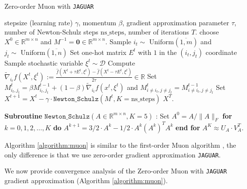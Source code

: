 \documentclass{article}
\theoremstyle{plain}
\theoremstyle{definition}
\theoremstyle{remark}
\begin{document}
\begin{algorithm}[H]
   \caption{Zero-order Muon with \texttt{JAGUAR} \cite{veprikov2024new}}
   \label{algorithm:muon}
\begin{algorithmic}[1]
     stepsize (learning rate) $\gamma$, momentum $\beta$, gradient approximation parameter $\tau$, number of Newton-Schulz steps $\text{ns\_steps}$, number of iterations $T$.
     choose  $X^{0} \in \mathbb{R}^{m \times n}$ and $M^{-1} = \mathbf{0} \in \mathbb{R}^{m \times n}$.
        \State Sample $i_t \sim \text{ Uniform}(\overline{1, m})$ and $j_t \sim \text{ Uniform}(\overline{1, n})$
        \State Set one-hot matrix $E^t$ with $1$ in the $(i_t, j_t)$ coordinate
        \State Sample stochastic variable $\xi^t \sim \mathcal{D}$
        \State Compute $\widetilde{\nabla}_{i_t} f(X^{t}, \xi^t) := \frac{\hat{f}(X^t + \tau E^t, \xi^t) - \hat{f}(X^t - \tau E^t, \xi^t)}{2 \tau} \in \mathbb{R}$
        \State Set $M^{t}_{i_t, j_t} = \beta M^{t-1}_{i_t, j_t} + (1 - \beta) \widetilde{\nabla}_{i_t} f(x^{t}, \xi^t)$ and $M^{t}_{i \neq i_t, j \neq j_t} = M^{t-1}_{i \neq i_t, j \neq j_t}$ \label{line:mt_jaguar}
        \State Set $X^{t+1} = X^t - \gamma \cdot \texttt{Newton\_Schulz}(M^{t}, K=\text{ns\_steps})$
    \EndFor
     $X^T$.
\end{algorithmic}
\begin{algorithmic}[1]
    \State \textbf{Subroutine} $\texttt{Newton\_Schulz}(A \in \mathbb{R}^{m \times n}, K = 5)$ \cite{bernstein2024old}:
    \State \quad Set $A^0 = A / \| A \|_F$
    \State \quad \textbf{for} {$k = 0, 1, 2, \dots, K$} \textbf{do}
    \State \quad \quad $A^{k+1} = 3/2 \cdot A^k - 1/2 \cdot A^k (A^k)^T A^k$
    \State \quad \textbf{end for}
    \State {} $A^K \approx U_A \cdot V_A^T$.
\end{algorithmic}
\end{algorithm}

Algorithm \ref{algorithm:muon} is similar to the first-order Muon algorithm \cite{muon_base}, the only difference is that we use zero-order gradient approximation \texttt{JAGUAR}. 

We now provide convergence analysis of the Zero-order Muon with \texttt{JAGUAR} gradient approximation (Algorithm \ref{algorithm:muon}).
\end{document}
